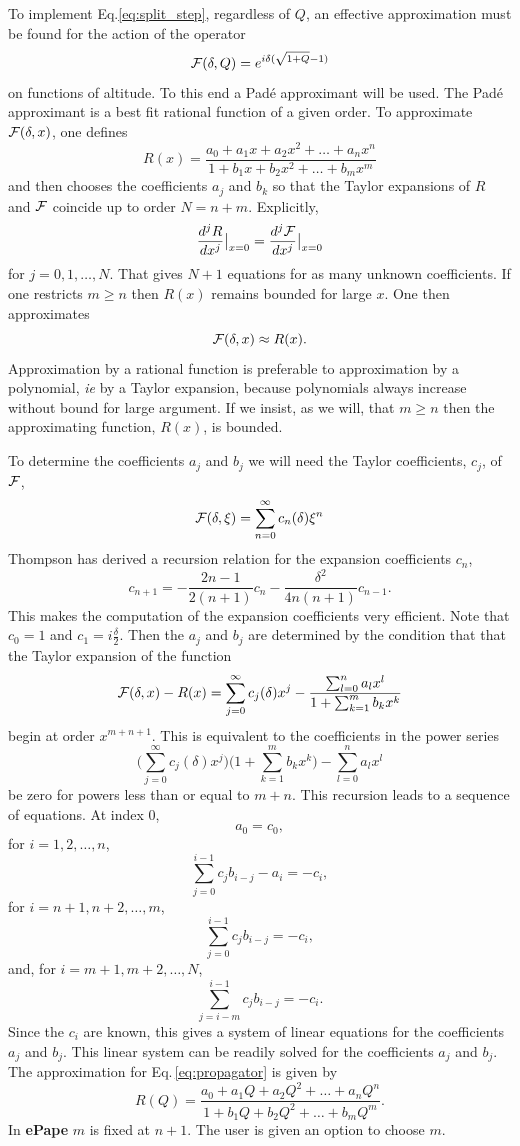 To implement Eq.\ref{eq:split_step}, regardless of $Q$, an effective approximation must be found for the action of the operator 
\begin{equation}\label{eq:propagator}
{\cal F}(\delta,Q)=e^{i\delta(\sqrt{1+Q}-1)}
\end{equation}
on functions of altitude. To this end a Pad\'e approximant will be used. The Pad\'e approximant is a best fit rational function of a given order. To approximate ${\cal F}(\delta,x)$, one defines 
\begin{equation}\label{eq:pade}
R(x)=\frac{a_0+a_1x+a_2x^2+\dots+a_nx^n}{1+b_1x+b_2x^2+\dots+b_mx^m}
\end{equation}
and then chooses the coefficients $a_j$ and $b_k$ so that the Taylor expansions of $R$ and ${\cal F}$ coincide up to order $N=n+m$. Explicitly, 
\[
\frac{d^j R}{dx^j}\big|_{x=0}=\frac{d^j {\cal F}}{dx^j}\big|_{x=0}
\]
for $j=0,1,\dots,N$. That gives $N+1$ equations for as many unknown coefficients. If one restricts $m\ge n$ then $R(x)$ remains bounded for large $x$. One then approximates 
\[
{\cal F}(\delta,x)\approx R(x). 
\]
Approximation by a rational function is preferable to approximation by a polynomial, {\it ie} by a Taylor expansion, because polynomials always increase without bound for large argument. If we insist, as we will, that $m\ge n$ then the approximating function, $R(x)$, is bounded. 

To determine the coefficients $a_j$ and $b_j$ we will need the Taylor coefficients, $c_j$, of ${\cal F}$, 
\[
{\cal F}(\delta,\xi)=\sum_{n=0}^\infty c_n(\delta) \xi^n
\]
Thompson\cite{roberts2013numerically} has derived a recursion relation for the expansion coefficients $c_n$, 
\[
c_{n+1}=-\frac{2n-1}{2(n+1)}c_n-\frac{\delta^2}{4n(n+1)}c_{n-1}. 
\]
This makes the computation of the expansion coefficients very efficient. Note that $c_0=1$ and $c_1=i\frac{\delta}{2}$. Then the $a_j$ and $b_j$ are determined by the condition that that the Taylor expansion of the function 
\[
{\cal F}(\delta,x)-R(x)
=
\sum_{j=0}^\infty c_j(\delta) x^j-\frac{\sum_{l=0}^n a_lx^l}{1+\sum_{k=1}^m b_kx^k}
\]
begin at order $x^{m+n+1}$. This is equivalent to the coefficients in the power series 
\[
\big(\sum_{j=0}^\infty c_j(\delta) x^j\big)\big(1+\sum_{k=1}^m b_kx^k\big)
-
\sum_{l=0}^n a_lx^l
\]
be zero for powers less than or equal to $m+n$. This recursion leads to a sequence of equations. At index $0$,  
\[
a_0=c_0,
\]
for $i=1,2,\dots,n$, 
\[
\sum_{j=0}^{i-1}c_jb_{i-j}-a_i=-c_i, 
\]
for $i=n+1,n+2,\dots,m$, 
\[
\sum_{j=0}^{i-1}c_jb_{i-j}=-c_i,
\]
and, for $i=m+1,m+2,\dots,N$, 
\[
\sum_{j=i-m}^{i-1}c_jb_{i-j}=-c_i. 
\]
Since the $c_i$ are known, this gives a system of linear equations for the coefficients $a_j$ and $b_j$. This linear system can be readily solved for the coefficients $a_j$ and $b_j$. The approximation for Eq.\,\ref{eq:propagator} is given by 
\[
R(Q)=\frac{a_0+a_1Q+a_2Q^2+\dots+a_nQ^n}{1+b_1Q+b_2Q^2+\dots+b_mQ^m}.
\]
In {\bf ePape} $m$ is fixed at $n+1$. The user is given an option to choose $m$.  

